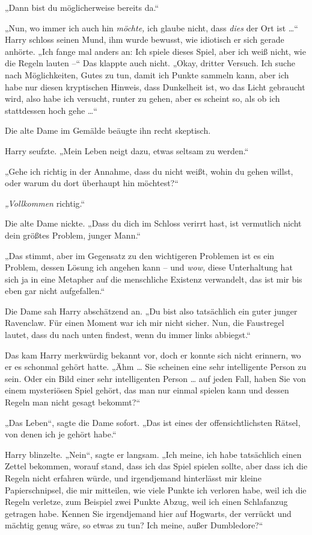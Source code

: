 „Dann bist du möglicherweise bereits da.“ 

„Nun, wo immer ich auch hin \emph{möchte,} ich glaube nicht, dass \emph{dies} der Ort ist …“ Harry schloss seinen Mund, ihm wurde bewusst, wie idiotisch er sich gerade anhörte. „Ich fange mal anders an: Ich spiele dieses Spiel, aber ich weiß nicht, wie die Regeln lauten –“ Das klappte auch nicht. „Okay, dritter Versuch. Ich suche nach Möglichkeiten, Gutes zu tun, damit ich Punkte sammeln kann, aber ich habe nur diesen kryptischen Hinweis, dass Dunkelheit ist, wo das Licht gebraucht wird, also habe ich versucht, runter zu gehen, aber es scheint so, als ob ich stattdessen hoch gehe …“ 

Die alte Dame im Gemälde beäugte ihn recht skeptisch. 

Harry seufzte. „Mein Leben neigt dazu, etwas seltsam zu werden.“ 

„Gehe ich richtig in der Annahme, dass du nicht weißt, wohin du gehen willst, oder warum du dort überhaupt hin möchtest?“ 

\emph{„Vollkommen} richtig.“ 

Die alte Dame nickte. „Dass du dich im Schloss verirrt hast, ist vermutlich nicht dein größtes Problem, junger Mann.“ 

„Das stimmt, aber im Gegensatz zu den wichtigeren Problemen ist es ein Problem, dessen Lösung ich angehen kann – und \emph{wow,} diese Unterhaltung hat sich ja in eine Metapher auf die menschliche Existenz verwandelt, das ist mir bis eben gar nicht aufgefallen.“ 

Die Dame sah Harry abschätzend an. „Du bist also tatsächlich ein guter junger Ravenclaw. Für einen Moment war ich mir nicht sicher. Nun, die Faustregel lautet, dass du nach unten findest, wenn du immer links abbiegst.“ 

Das kam Harry merkwürdig bekannt vor, doch er konnte sich nicht erinnern, wo er es schonmal gehört hatte. „Ähm … Sie scheinen eine sehr intelligente Person zu sein. Oder ein Bild einer sehr intelligenten Person … auf jeden Fall, haben Sie von einem mysteriösen Spiel gehört, das man nur einmal spielen kann und dessen Regeln man nicht gesagt bekommt?“ 

„Das Leben“, sagte die Dame sofort. „Das ist eines der offensichtlichsten Rätsel, von denen ich je gehört habe.“ 

Harry blinzelte. „Nein“, sagte er langsam. „Ich meine, ich habe tatsächlich einen Zettel bekommen, worauf stand, dass ich das Spiel spielen sollte, aber dass ich die Regeln nicht erfahren würde, und irgendjemand hinterlässt mir kleine Papierschnipsel, die mir mitteilen, wie viele Punkte ich verloren habe, weil ich die Regeln verletze, zum Beispiel zwei Punkte Abzug, weil ich einen Schlafanzug getragen habe. Kennen Sie irgendjemand hier auf Hogwarts, der verrückt und mächtig genug wäre, so etwas zu tun? Ich meine, außer Dumbledore?“ 

